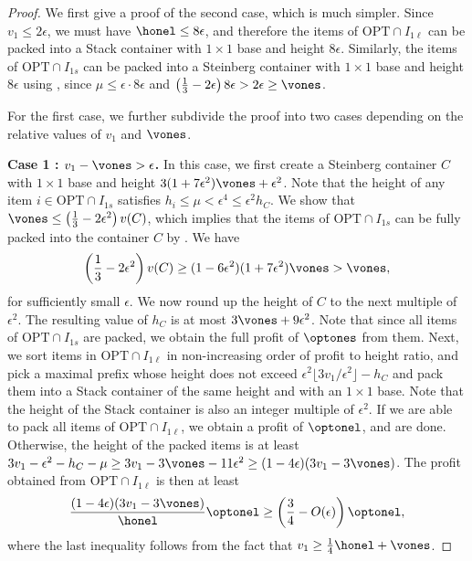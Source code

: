 \begin{proof}
    We first give a proof of the second case, which is much simpler. Since $v_1\le 2\epsilon$, we must have $\honel\le 8\epsilon$, and therefore the items of $\text{OPT}\cap I_{1\ell}$ can be packed into a Stack container with $1\times 1$ base and height $8\epsilon$. Similarly, the items of $\text{OPT}\cap I_{1s}$ can be packed into a Steinberg container with $1\times 1$ base and height $8\epsilon$ using , since $\mu \le \epsilon\cdot 8\epsilon$ and $\left(\frac{1}{3}-2\epsilon\right)8\epsilon > 2\epsilon \ge \vones$.


    For the first case, we further subdivide the proof into two cases depending on the relative values of $v_1$ and $\vones$.

    \textbf{Case 1 : $v_1-\vones >\epsilon$.} In this case, we first create a Steinberg container $C$ with $1\times 1$ base and height $3(1+7\epsilon^2)\vones + \epsilon^2$. Note that the height of any item $i\in \text{OPT}\cap I_{1s}$ satisfies $h_i \le \mu < \epsilon^4 \le \epsilon^2 h_C$. We show that $\vones \le \left(\frac{1}{3}-2\epsilon^2\right)v(C)$, which implies that the items of $\text{OPT}\cap I_{1s}$ can be fully packed into the container $C$ by . We have
    \[ \left(\frac{1}{3}-2\epsilon^2\right)v(C) \ge (1-6\epsilon^2)(1+7\epsilon^2)\vones
    > \vones, \]
    for sufficiently small $\epsilon$. We now round up the height of $C$ to the next multiple of $\epsilon^2$. The resulting value of $h_C$ is at most $3\vones+ 9\epsilon^2$. Note that since all items of $\text{OPT}\cap I_{1s}$ are packed, we obtain the full profit of $\optones$ from them. Next, we sort items in $\text{OPT}\cap I_{1\ell}$ in non-increasing order of profit to height ratio, and pick a maximal prefix whose height does not exceed $\epsilon^2 \lfloor3v_1/\epsilon^2\rfloor -h_C$ and pack them into a Stack container of the same height and with an $1\times 1$ base. Note that the height of the Stack container is also an integer multiple of $\epsilon^2$. If we are able to pack all items of $\text{OPT}\cap I_{1\ell}$, we obtain a profit of $\optonel$, and are done. Otherwise, the height of the packed items is at least $3v_1-\epsilon^2 - h_C -\mu\ge 3v_1-3\vones-11\epsilon^2 \ge (1-4\epsilon)(3v_1 - 3\vones)$. The profit obtained from $\text{OPT}\cap I_{1\ell}$ is then at least
    \[ \frac{(1-4\epsilon)(3v_1-3\vones)}{\honel}\optonel \ge \left(\frac{3}{4}-O(\epsilon)\right)\optonel, \]
    where the last inequality follows from the fact that $v_1\ge \frac{1}{4}\honel+\vones$.


\end{proof}
